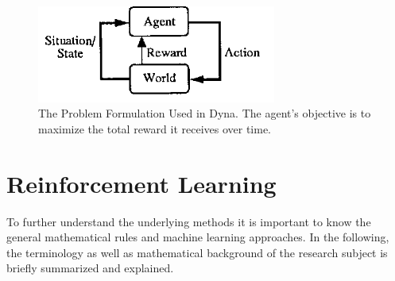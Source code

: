 \documentclass[a4paper]{article}
\begin{document}
	
	\begin{figure}[t]
		\centering
		\includegraphics[angle=0,width=0.7\textwidth]{./figs/Dyna-Figure1.png}
		\caption{\label{fig:dyna}The Problem Formulation Used in Dyna. The agent's objective is to maximize the total reward it receives over time. \citep{Dyna}}
	\end{figure}

	\section{Reinforcement Learning}
	To further understand the underlying methods it is important to know the general mathematical rules and machine learning approaches. In the following, the terminology as well as mathematical background of the research subject is briefly summarized and explained. 
	
\end{document}
